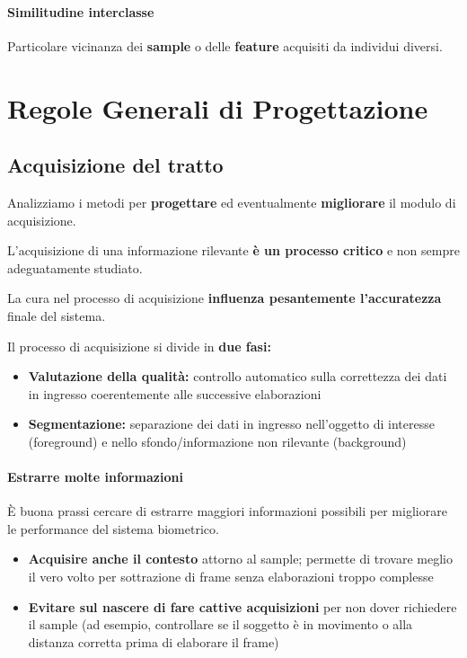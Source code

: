 \subsubsection{Similitudine interclasse}

Particolare vicinanza dei \textbf{sample} o delle \textbf{feature} acquisiti da individui diversi.

\chapter{Regole Generali di Progettazione}

\section{Acquisizione del tratto}

Analizziamo i metodi per \textbf{progettare} ed eventualmente \textbf{migliorare} il modulo di acquisizione.

L'acquisizione di una informazione rilevante \textbf{è un processo critico} e non sempre adeguatamente studiato.

La cura nel processo di acquisizione \textbf{influenza pesantemente l'accuratezza} finale del sistema.

Il processo di acquisizione si divide in \textbf{due fasi:}
\begin{itemize}
    \item \textbf{Valutazione della qualità:} controllo automatico sulla correttezza dei dati in ingresso coerentemente alle successive elaborazioni
    \item \textbf{Segmentazione:} separazione dei dati in ingresso nell'oggetto di interesse (foreground) e nello sfondo/informazione non rilevante (background)
\end{itemize}

\subsubsection{Estrarre molte informazioni}

È buona prassi cercare di estrarre maggiori informazioni possibili per migliorare le performance del sistema biometrico.
\begin{itemize}
    \item \textbf{Acquisire anche il contesto} attorno al sample; permette di trovare meglio il vero volto per sottrazione di frame senza elaborazioni troppo complesse
    \item \textbf{Evitare sul nascere di fare cattive acquisizioni} per non dover richiedere il sample (ad esempio, controllare se il soggetto è in movimento o alla distanza corretta prima di elaborare il frame)
\end{itemize}

